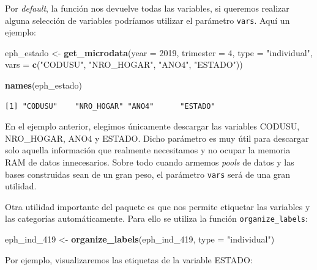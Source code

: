 \documentclass[
]{article}
\newenvironment{Shaded}{\begin{snugshade}}{\end{snugshade}}
\newcommand{\AttributeTok}[1]{\textcolor[rgb]{0.13,0.29,0.53}{#1}}
\newcommand{\DecValTok}[1]{\textcolor[rgb]{0.00,0.00,0.81}{#1}}
\newcommand{\FunctionTok}[1]{\textcolor[rgb]{0.13,0.29,0.53}{\textbf{#1}}}
\newcommand{\NormalTok}[1]{#1}
\newcommand{\OtherTok}[1]{\textcolor[rgb]{0.56,0.35,0.01}{#1}}
\newcommand{\SpecialCharTok}[1]{\textcolor[rgb]{0.81,0.36,0.00}{\textbf{#1}}}
\newcommand{\StringTok}[1]{\textcolor[rgb]{0.31,0.60,0.02}{#1}}
\begin{document}
Por \emph{default}, la función nos devuelve todas las variables, si queremos realizar alguna selección de variables podríamos utilizar el parámetro \texttt{vars}. Aquí un ejemplo:

\begin{Shaded}
\begin{Highlighting}[]
\NormalTok{eph\_estado }\OtherTok{\textless{}{-}} \FunctionTok{get\_microdata}\NormalTok{(}\AttributeTok{year =} \DecValTok{2019}\NormalTok{, }\AttributeTok{trimester =} \DecValTok{4}\NormalTok{, }\AttributeTok{type =} \StringTok{"individual"}\NormalTok{, }\AttributeTok{vars =} \FunctionTok{c}\NormalTok{(}\StringTok{"CODUSU"}\NormalTok{,}
    \StringTok{"NRO\_HOGAR"}\NormalTok{, }\StringTok{"ANO4"}\NormalTok{, }\StringTok{"ESTADO"}\NormalTok{))}

\FunctionTok{names}\NormalTok{(eph\_estado)}
\end{Highlighting}
\end{Shaded}

\begin{verbatim}
[1] "CODUSU"    "NRO_HOGAR" "ANO4"      "ESTADO"   
\end{verbatim}

En el ejemplo anterior, elegimos únicamente descargar las variables CODUSU, NRO\_HOGAR, ANO4 y ESTADO. Dicho parámetro es muy útil para descargar solo aquella información que realmente necesitamos y no ocupar la memoria RAM de datos innecesarios. Sobre todo cuando armemos \emph{pools} de datos y las bases construidas sean de un gran peso, el parámetro \texttt{vars} será de una gran utilidad.

Otra utilidad importante del paquete es que nos permite etiquetar las variables y las categorías automáticamente. Para ello se utiliza la función \texttt{organize\_labels}:

\begin{Shaded}
\begin{Highlighting}[]
\NormalTok{eph\_ind\_419 }\OtherTok{\textless{}{-}} \FunctionTok{organize\_labels}\NormalTok{(eph\_ind\_419, }\AttributeTok{type =} \StringTok{"individual"}\NormalTok{)}
\end{Highlighting}
\end{Shaded}

Por ejemplo, visualizaremos las etiquetas de la variable ESTADO:

\begin{Shaded}
\end{Shaded}
\end{document}
